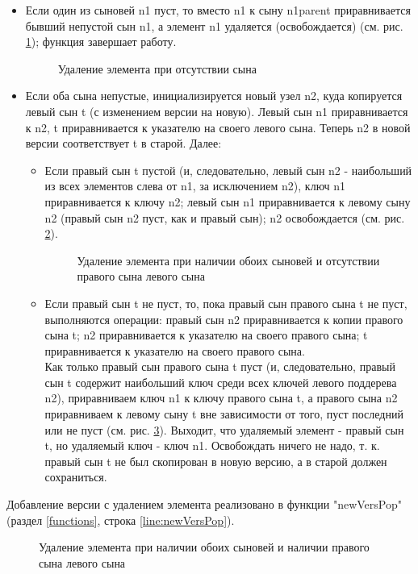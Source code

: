 \documentclass[zuev-23631-2-report.tex]{subfiles}
\begin{document}
\begin{itemize}
\item{} Если один из сыновей n1 пуст, то вместо n1 к сыну n1parent приравнивается бывший непустой сын n1, а элемент n1 удаляется (освобождается) (см. рис. \ref{treeRemove1}); функция завершает работу.

\begin{figure}[h]
\caption{Удаление элемента при отсутствии сына}
\label{treeRemove1}
\end{figure}

\item{} Если оба сына непустые, инициализируется новый узел n2, куда копируется левый сын t (с изменением версии на новую). Левый сын n1 приравнивается к n2, t приравнивается к указателю на своего левого сына. Теперь n2 в новой версии соответствует t в старой. Далее:
\begin{itemize}
\item{}Если правый сын t пустой (и, следовательно, левый сын n2 - наибольший из всех элементов слева от n1, за исключением n2), ключ n1 приравнивается к ключу n2; левый сын n1 приравнивается к левому сыну n2 (правый сын n2 пуст, как и правый сын); n2 освобождается  (см. рис. \ref{treeRemove2}).

\begin{figure}[H]
\caption{Удаление элемента при наличии обоих сыновей и отсутствии правого сына левого сына}
\label{treeRemove2}
\end{figure}

\item{}Если правый сын t не пуст, то, пока правый сын правого сына t не пуст, выполняются операции: правый сын n2 приравнивается к копии правого сына t; n2 приравнивается к указателю на своего правого сына; t приравнивается к указателю на своего правого сына.\\
Как только правый сын правого сына t пуст (и, следовательно, правый сын t содержит наибольший ключ среди всех ключей левого поддерева n2), приравниваем ключ n1 к ключу правого сына t, а правого сына n2 приравниваем к левому сыну t вне зависимости от того, пуст последний или не пуст  (см. рис. \ref{treeRemove3}). Выходит, что удаляемый элемент - правый сын t, но удаляемый ключ - ключ n1. Освобождать ничего не надо, т. к. правый сын t не был скопирован в новую версию, а в старой должен сохраниться.
\end{itemize}
\end{itemize}
Добавление версии с удалением элемента реализовано в функции "newVersPop"\hspace{0pt} (раздел \ref{functions}, строка \ref{line:newVersPop}).\\
\begin{figure}[h]
\caption{Удаление элемента при наличии обоих сыновей и наличии правого сына левого сына}
\label{treeRemove3}
\end{figure}
\end{document}
